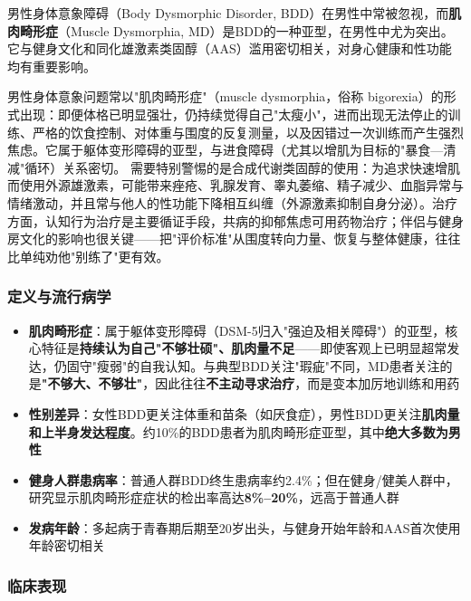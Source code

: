 \documentclass[12pt,a4paper,twoside]{ctexbook}
\begin{document}
男性身体意象障碍（Body Dysmorphic Disorder, BDD）在男性中常被忽视，而\textbf{肌肉畸形症}（Muscle Dysmorphia, MD）是BDD的一种亚型，在男性中尤为突出。它与健身文化和同化雄激素类固醇（AAS）滥用密切相关，对身心健康和性功能均有重要影响。


男性身体意象问题常以"肌肉畸形症"（muscle dysmorphia，俗称 bigorexia）的形式出现：即便体格已明显强壮，仍持续觉得自己"太瘦小"，进而出现无法停止的训练、严格的饮食控制、对体重与围度的反复测量，以及因错过一次训练而产生强烈焦虑。它属于躯体变形障碍的亚型，与进食障碍（尤其以增肌为目标的"暴食—清减"循环）关系密切。
需要特别警惕的是合成代谢类固醇的使用：为追求快速增肌而使用外源雄激素，可能带来痤疮、乳腺发育、睾丸萎缩、精子减少、血脂异常与情绪激动，并且常与他人的性功能下降相互纠缠（外源激素抑制自身分泌）。治疗方面，认知行为治疗是主要循证手段，共病的抑郁焦虑可用药物治疗；伴侣与健身房文化的影响也很关键——把"评价标准"从围度转向力量、恢复与整体健康，往往比单纯劝他"别练了"更有效。

\subsubsection{定义与流行病学}

\begin{itemize}[leftmargin=2cm]
	\item \textbf{肌肉畸形症}：属于躯体变形障碍（DSM-5归入"强迫及相关障碍"）的亚型，核心特征是\textbf{持续认为自己"不够壮硕"、肌肉量不足}——即使客观上已明显超常发达，仍固守"瘦弱"的自我认知。与典型BDD关注"瑕疵"不同，MD患者关注的是\textbf{"不够大、不够壮"}，因此往往\textbf{不主动寻求治疗}，而是变本加厉地训练和用药
	\item \textbf{性别差异}：女性BDD更关注体重和苗条（如厌食症），男性BDD更关注\textbf{肌肉量和上半身发达程度}。约10\%的BDD患者为肌肉畸形症亚型，其中\textbf{绝大多数为男性}
	\item \textbf{健身人群患病率}：普通人群BDD终生患病率约2.4\%；但在健身/健美人群中，研究显示肌肉畸形症症状的检出率高达\textbf{8\%--20\%}，远高于普通人群
	\item \textbf{发病年龄}：多起病于青春期后期至20岁出头，与健身开始年龄和AAS首次使用年龄密切相关
\end{itemize}

\subsubsection{临床表现}
\end{document}
